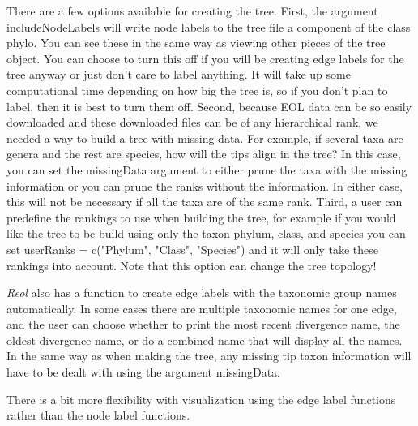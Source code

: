 \documentclass[12pt]{article}
\begin{document}
There are a few options available for creating the tree.  First, the argument includeNodeLabels will write node labels to the tree file a component of the class phylo.  You can see these in the same way as viewing other pieces of the tree object.  You can choose to turn this off if you will be creating edge labels for the tree anyway or just don't care to label anything.  It will take up some computational time depending on how big the tree is, so if you don't plan to label, then it is best to turn them off.  Second, because EOL data can be so easily downloaded and these downloaded files can be of any hierarchical rank, we needed a way to build a tree with missing data.  For example, if several taxa are genera and the rest are species, how will the tips align in the tree?  In this case, you can set the missingData argument to either prune the taxa with the missing information or you can prune the ranks without the information.  In either case, this will not be necessary if all the taxa are of the same rank.  Third, a user can predefine the rankings to use when building the tree, for example if you would like the tree to be build using only the taxon phylum, class, and species you can set userRanks = c("Phylum", "Class", "Species") and it will only take these rankings into account.  Note that this option can change the tree topology!  

\textit{Reol} also has a function to create edge labels with the taxonomic group names automatically. In some cases there are multiple taxonomic names for one edge, and the user can choose whether to print the most recent divergence name, the oldest divergence name, or do a combined name that will display all the names.  In the same way as when making the tree, any missing tip taxon information will have to be dealt with using the argument missingData.  

There is a bit more flexibility with visualization using the edge label functions rather than the node label functions. 
\end{document}

